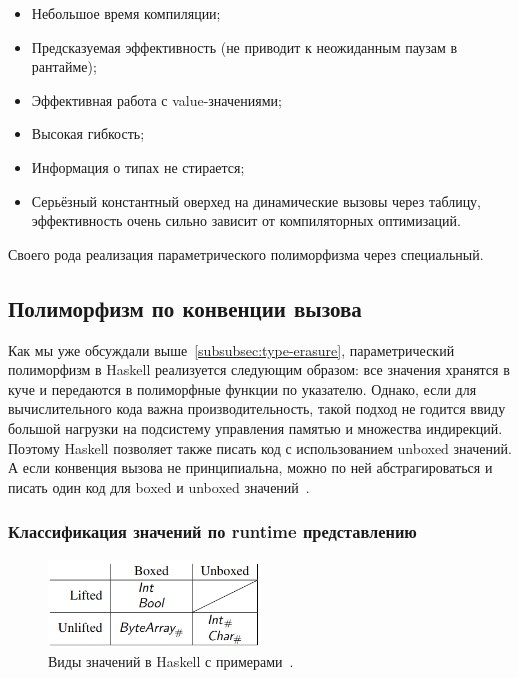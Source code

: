 \begin{itemize}
    \item[\positive] Небольшое время компиляции;
    \item[\positive] Предсказуемая эффективность (не приводит к неожиданным паузам в рантайме);
    \item[\positive] Эффективная работа с value-значениями;
    \item[\positive] Высокая гибкость;
    \item[\positive] Информация о типах не стирается;
    \item[\negative] Серьёзный константный оверхед на динамические вызовы через таблицу, эффективность очень сильно зависит от компиляторных оптимизаций.
\end{itemize}

Своего рода реализация параметрического полиморфизма через специальный.

\subsection{Полиморфизм по конвенции вызова} \label{subsec:representation-polymorphism}

Как мы уже обсуждали выше~\ref{subsubsec:type-erasure}, параметрический полиморфизм в Haskell реализуется следующим образом: все значения хранятся в куче и передаются в полиморфные функции по указателю.
Однако, если для вычислительного кода важна производительность, такой подход не годится ввиду большой нагрузки на подсистему управления памятью и множества индирекций.
Поэтому Haskell позволяет также писать код с использованием unboxed значений.
А если конвенция вызова не принципиальна, можно по ней абстрагироваться и писать один код для boxed и unboxed значений~\cite{eisenberg2017levity}.

\subsubsection{Классификация значений по runtime представлению}

\begin{figure}
    \centering
    \includegraphics[width=0.5\textwidth]{figs/haskell-value-kinds}
    \caption{Виды значений в Haskell с примерами~\cite{eisenberg2017levity}.}
    \label{fig:haskell-value-kinds}
\end{figure}

